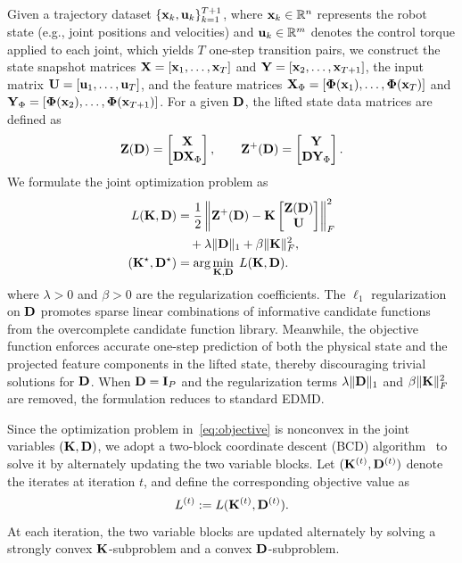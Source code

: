 Given a trajectory dataset $\{\mathbf{x}_k, \mathbf{u}_k\}_{k=1}^{T+1}$, where $\mathbf{x}_k \in \mathbb{R}^n$ represents the robot state (e.g., joint positions and velocities) and $\mathbf{u}_k \in \mathbb{R}^m$ denotes the control torque applied to each joint, which yields $T$ one-step transition pairs, we construct the state snapshot matrices $\mathbf{X} = [\mathbf{x}_1, \dots, \mathbf{x}_T]$ and $\mathbf{Y} = [\mathbf{x}_2, \dots, \mathbf{x}_{T+1}]$, the input matrix $\mathbf{U} = [\mathbf{u}_1, \dots, \mathbf{u}_T]$, and the feature matrices $\mathbf{X}_{\Phi} = [\boldsymbol{\Phi}(\mathbf{x}_1), \dots, \boldsymbol{\Phi}(\mathbf{x}_T)]$ and $\mathbf{Y}_{\Phi} = [\boldsymbol{\Phi}(\mathbf{x}_2), \dots, \boldsymbol{\Phi}(\mathbf{x}_{T+1})]$. For a given $\mathbf{D}$, the lifted state data matrices are defined as
\begin{equation}
\mathbf{Z}(\mathbf{D}) =
\begin{bmatrix}
\mathbf{X} \\ \mathbf{D} \mathbf{X}_{\Phi}
\end{bmatrix}, \qquad
\mathbf{Z}^+(\mathbf{D}) =
\begin{bmatrix}
\mathbf{Y} \\ \mathbf{D} \mathbf{Y}_{\Phi}
\end{bmatrix}.
\end{equation}
We formulate the joint optimization problem as
\begin{equation}
\label{eq:objective}
\begin{aligned}
L(\mathbf{K},\mathbf{D}) &= \frac{1}{2}
\left\|
\mathbf{Z}^+(\mathbf{D}) - \mathbf{K}
\begin{bmatrix}
\mathbf{Z}(\mathbf{D}) \\ \mathbf{U}
\end{bmatrix}
\right\|_F^2 \\
&\quad + \lambda\|\mathbf{D}\|_1 + \beta\|\mathbf{K}\|_F^2, \\
(\mathbf{K}^\star, \mathbf{D}^\star) &= \arg\min_{\mathbf{K},\mathbf{D}} \; L(\mathbf{K},\mathbf{D}).
\end{aligned}
\end{equation}
where $\lambda>0$ and $\beta>0$ are the regularization coefficients. The $\ell_1$ regularization on $\mathbf{D}$ promotes sparse linear combinations of informative candidate functions from the overcomplete candidate function library. Meanwhile, the objective function enforces accurate one-step prediction of both the physical state and the projected feature components in the lifted state, thereby discouraging trivial solutions for $\mathbf{D}$. When $\mathbf{D} = \mathbf{I}_P$ and the regularization terms $\lambda\|\mathbf{D}\|_1$ and $\beta\|\mathbf{K}\|_F^2$ are removed, the formulation reduces to standard EDMD.

Since the optimization problem in~\eqref{eq:objective} is nonconvex in
the joint variables $(\mathbf{K},\mathbf{D})$, we adopt a two-block coordinate
descent (BCD) algorithm~\cite{Tseng2001} to solve it by alternately
updating the two variable blocks. Let $(\mathbf{K}^{(t)},\mathbf{D}^{(t)})$
denote the iterates at iteration $t$, and define the corresponding objective value as
\[
L^{(t)} := L(\mathbf{K}^{(t)},\mathbf{D}^{(t)}).
\]
At each iteration, the two variable blocks are updated alternately by solving a strongly convex $\mathbf{K}$-subproblem and a convex $\mathbf{D}$-subproblem.

